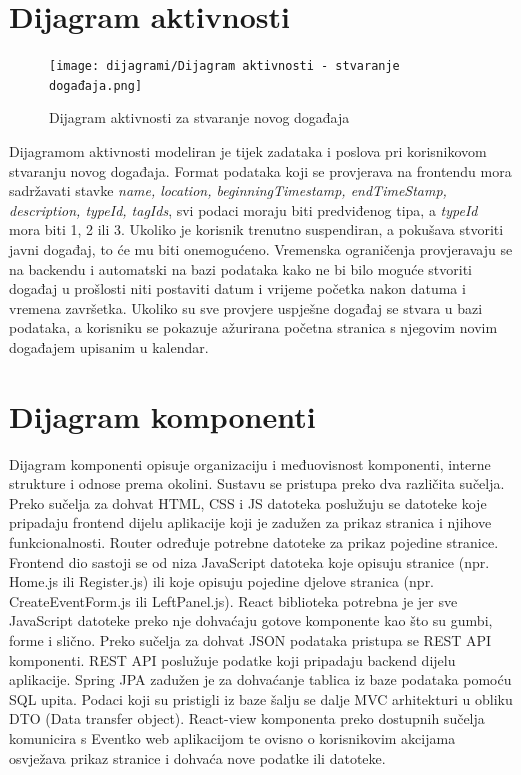 				\eject 
		
			\section{Dijagram aktivnosti}
			
				\begin{figure}[H]
					\texttt{[image: dijagrami/Dijagram aktivnosti - stvaranje događaja.png]}
					\caption{Dijagram aktivnosti za stvaranje novog događaja}
				\end{figure}
			
				\indent Dijagramom aktivnosti modeliran je tijek zadataka i poslova pri korisnikovom stvaranju novog događaja. Format podataka koji se provjerava na frontendu mora sadržavati stavke \textit{name, location, beginningTimestamp, endTimeStamp, description, typeId, tagIds}, svi podaci moraju biti predviđenog tipa, a \textit{typeId} mora biti 1, 2 ili 3. Ukoliko je korisnik trenutno suspendiran, a pokušava stvoriti javni događaj, to će mu biti onemogućeno. Vremenska ograničenja provjeravaju se na backendu i automatski na bazi podataka kako ne bi bilo moguće stvoriti događaj u prošlosti niti postaviti datum i vrijeme početka nakon datuma i vremena završetka. Ukoliko su sve provjere uspješne događaj se stvara u bazi podataka, a korisniku se pokazuje ažurirana početna stranica s njegovim novim događajem upisanim u kalendar.
			
				\eject
				
			\section{Dijagram komponenti}
		
				\indent Dijagram komponenti opisuje organizaciju i međuovisnost komponenti, interne strukture i odnose prema okolini. Sustavu se pristupa preko dva različita sučelja. Preko sučelja za dohvat HTML, CSS i JS datoteka poslužuju se datoteke koje pripadaju frontend dijelu aplikacije koji je zadužen za prikaz stranica i njihove funkcionalnosti. Router određuje potrebne datoteke za prikaz pojedine stranice. Frontend dio sastoji se od niza JavaScript datoteka koje opisuju stranice (npr. Home.js ili Register.js) ili koje opisuju pojedine djelove stranica (npr. CreateEventForm.js ili LeftPanel.js). React biblioteka potrebna je jer sve JavaScript datoteke preko nje dohvaćaju gotove komponente kao što su gumbi, forme i slično. Preko sučelja za dohvat JSON podataka pristupa se REST API komponenti. REST API poslužuje podatke koji pripadaju backend dijelu aplikacije. Spring JPA zadužen je za dohvaćanje tablica iz baze podataka pomoću SQL upita. Podaci koji su pristigli iz baze šalju se dalje MVC arhitekturi u obliku DTO (Data transfer object). React-view komponenta preko dostupnih sučelja komunicira s Eventko web aplikacijom te ovisno o korisnikovim akcijama osvježava prikaz stranice i dohvaća nove podatke ili datoteke.

